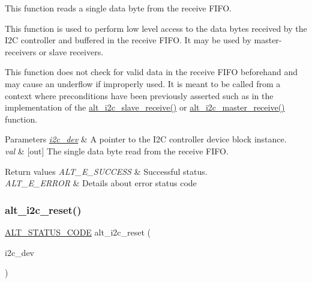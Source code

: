 This function reads a single data byte from the receive F\+I\+FO.

This function is used to perform low level access to the data bytes received by the I2C controller and buffered in the receive F\+I\+FO. It may be used by master-\/receivers or slave receivers.

This function does not check for valid data in the receive F\+I\+FO beforehand and may cause an underflow if improperly used. It is meant to be called from a context where preconditions have been previously asserted such as in the implementation of the \mbox{\hyperlink{group__ALT__I2C_gaadba976480855d6b962cd0abbdb01c42}{alt\+\_\+i2c\+\_\+slave\+\_\+receive()}} or \mbox{\hyperlink{group__ALT__I2C_gab0663c3f923ca348dc16b5f4a4f96f9b}{alt\+\_\+i2c\+\_\+master\+\_\+receive()}} function.


\begin{DoxyParams}{Parameters}
{\em \mbox{\hyperlink{structi2c__dev}{i2c\+\_\+dev}}} & A pointer to the I2C controller device block instance.\\
\hline
{\em val} & \mbox{[}out\mbox{]} The single data byte read from the receive F\+I\+FO.\\
\hline
\end{DoxyParams}

\begin{DoxyRetVals}{Return values}
{\em A\+L\+T\+\_\+\+E\+\_\+\+S\+U\+C\+C\+E\+SS} & Successful status. \\
\hline
{\em A\+L\+T\+\_\+\+E\+\_\+\+E\+R\+R\+OR} & Details about error status code \\
\hline
\end{DoxyRetVals}
\mbox{\label{group__ALT__I2C_gaeabf95833cc757c3ff6315c13194777d}} 
\subsubsection{\texorpdfstring{alt\_i2c\_reset()}{alt\_i2c\_reset()}}
{\footnotesize\ttfamily \mbox{\hyperlink{hwlib_8h_abdb0d369f069723ca55d6c94bcaaaa12}{A\+L\+T\+\_\+\+S\+T\+A\+T\+U\+S\+\_\+\+C\+O\+DE}} alt\+\_\+i2c\+\_\+reset (\begin{DoxyParamCaption}\item[{\mbox{\hyperlink{structALT__I2C__DEV__s}{A\+L\+T\+\_\+\+I2\+C\+\_\+\+D\+E\+V\+\_\+t}} $\ast$}]{i2c\+\_\+dev }\end{DoxyParamCaption})}

